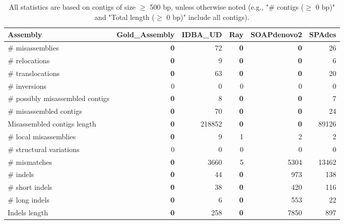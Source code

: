 \documentclass[12pt,a4paper]{article}
\begin{document}
\begin{table}[ht]
\begin{center}
\caption{All statistics are based on contigs of size $\geq$ 500 bp, unless otherwise noted (e.g., "\# contigs ($\geq$ 0 bp)" and "Total length ($\geq$ 0 bp)" include all contigs).}
\begin{tabular}{|l*{5}{|r}|}
\hline
Assembly & Gold\_Assembly & IDBA\_UD & Ray & SOAPdenovo2 & SPAdes \\ \hline
\# misassemblies & {\bf 0} & 72 & {\bf 0} & {\bf 0} & 26 \\ \hline
\hspace{5mm}\# relocations & {\bf 0} & 9 & {\bf 0} & {\bf 0} & 6 \\ \hline
\hspace{5mm}\# translocations & {\bf 0} & 63 & {\bf 0} & {\bf 0} & 20 \\ \hline
\hspace{5mm}\# inversions & 0 & 0 & 0 & 0 & 0 \\ \hline
\# possibly misassembled contigs & {\bf 0} & 8 & {\bf 0} & {\bf 0} & 7 \\ \hline
\# misassembled contigs & {\bf 0} & 70 & {\bf 0} & {\bf 0} & 24 \\ \hline
Misassembled contigs length & {\bf 0} & 218852 & {\bf 0} & {\bf 0} & 89126 \\ \hline
\# local misassemblies & {\bf 0} & 9 & 1 & 2 & 2 \\ \hline
\# structural variations & 0 & 0 & 0 & 0 & 0 \\ \hline
\# mismatches & {\bf 0} & 3660 & 5 & 5304 & 13462 \\ \hline
\# indels & {\bf 0} & 44 & {\bf 0} & 973 & 138 \\ \hline
\hspace{5mm}\# short indels & {\bf 0} & 38 & {\bf 0} & 420 & 116 \\ \hline
\hspace{5mm}\# long indels & {\bf 0} & 6 & {\bf 0} & 553 & 22 \\ \hline
Indels length & {\bf 0} & 258 & {\bf 0} & 7850 & 897 \\ \hline
\end{tabular}
\end{center}
\end{table}
\end{document}

